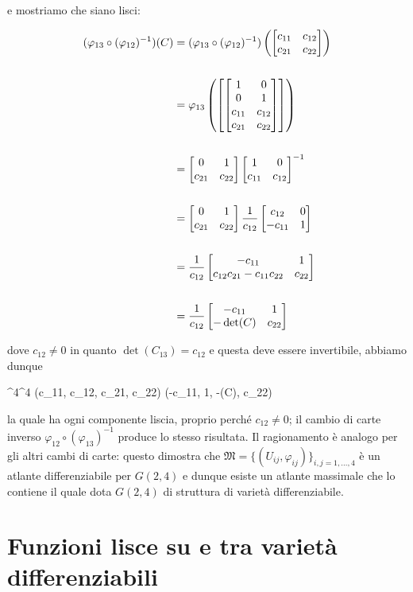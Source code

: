 e mostriamo che siano lisci:

\begin{align}
	\begin{split}
		(\varphi_{13} \circ (\varphi_{12})^{-1}) (C) &= (\varphi_{13} \circ (\varphi_{12})^{-1}) \left( \bmqty{ c_{11} & c_{12} \\ c_{21} & c_{22} } \right) \\ \\
		&= \varphi_{13} \left( \left[ \bmqty{ 1 & 0 \\ 0 & 1 \\ c_{11} & c_{12} \\ c_{21} & c_{22} } \right] \right) \\ \\
		&= \bmqty{ 0 & 1 \\ c_{21} & c_{22} } \bmqty{ 1 & 0 \\ c_{11} & c_{12} }^{-1} \\ \\
		&= \bmqty{ 0 & 1 \\ c_{21} & c_{22} } \dfrac{1}{c_{12}} \bmqty{ c_{12} & 0 \\ -c_{11} & 1 } \\ \\
		&= \dfrac{1}{c_{12}} \bmqty{ -c_{11} & 1 \\ c_{12} c_{21} - c_{11} c_{22} & c_{22} } \\ \\
		&= \dfrac{1}{c_{12}} \bmqty{ -c_{11} & 1 \\ -\det(C) & c_{22} }
	\end{split}
\end{align}

dove $ c_{12} \neq 0 $ in quanto $ \det(C_{13}) = c_{12} $ e questa deve essere invertibile, abbiamo dunque

	{\R^{4}}{\R^{4}}
	{(c_{11}, c_{12}, c_{21}, c_{22})}{ (-c_{11}, 1, -\det(C), c_{22})}

la quale ha ogni componente liscia, proprio perché $ c_{12} \neq 0 $; il cambio di carte inverso $ \varphi_{12} \circ (\varphi_{13})^{-1} $ produce lo stesso risultata. Il ragionamento è analogo per gli altri cambi di carte: questo dimostra che $ \mathfrak{M} = \{(U_{ij},\varphi_{ij})\}_{i,j=1,\dots,4} $ è un atlante differenziabile per $ G(2,4) $ e dunque esiste un atlante massimale che lo contiene il quale dota $ G(2,4) $ di struttura di varietà differenziabile.

\section{Funzioni lisce su e tra varietà differenziabili}

